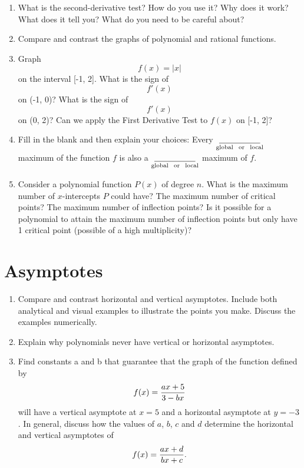 \begin{enumerate}
\item  What is the second-derivative test?  How do you use it?  Why does it work?  What does it tell you?  What do you need to be careful about?

\item  Compare and contrast the graphs of polynomial and rational functions.

\item  Graph $$f(x) = \left| x \right|$$ on the interval [-1, 2].  What is the sign of $$f'\left( x \right)$$ on (-1, 0)?  What is the sign of $$f'\left( x \right)$$ on (0, 2)?  Can we apply the First Derivative Test to $f(x)$ on [-1, 2]?

\item  Fill in the blank and then explain your choices:  Every $\mathop {\underline {\quad \quad \quad \quad \quad } }\limits_{{\rm{global}}\ \  {\rm{or}}\ \   {\rm{local}}} $
 maximum of the function $f$ is also a $\mathop {\underline {\quad \quad \quad \quad \quad } }\limits_{{\rm{global}}\ \  {\rm{or}}\ \  {\rm{local}}} $
 maximum of $f$.

\item  Consider a polynomial function $P(x)$ of degree $n$.  What is the maximum number of $x$-intercepts $P$ could have?  The maximum number of critical points?  The maximum number of inflection points?  Is it possible for a polynomial to attain the maximum number of inflection points but only have 1 critical point (possible of a high multiplicity)? 

\end{enumerate}\section{Asymptotes}\begin{enumerate}

\item  Compare and contrast horizontal and vertical asymptotes.  Include both analytical and visual examples to illustrate the points you make.  Discuss the examples numerically.

\item  Explain why polynomials never have  vertical or horizontal asymptotes.  \cite{SM}

\item  Find constants a and b that guarantee that the graph of the function defined by $$f(x) = {{ax + 5} \over {3 - bx}}$$ will have a vertical asymptote at $x = 5$ and a horizontal asymptote at 
$y = -3$. \cite{SBS}  In general, discuss how the values of $a$, $b$, $c$ and $d$ determine the horizontal and vertical asymptotes of $$f(x) = {{ax + d} \over {bx + c}}.$$


\end{enumerate}
